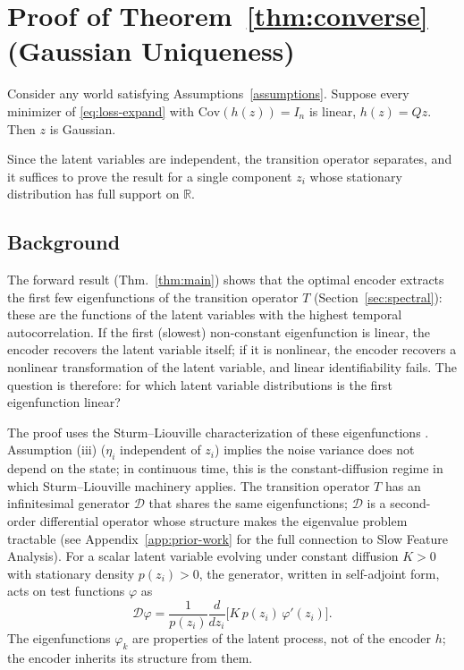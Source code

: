 \newpage
\section{Proof of Theorem~\ref{thm:converse} (Gaussian Uniqueness)}\label{app:converse-proof}

\begin{theoremrestate}
Consider any world satisfying Assumptions~\ref{assumptions}. Suppose every minimizer of \eqref{eq:loss-expand} with $\mathrm{Cov}(h(z)) = I_n$ is linear, $h(z) = Qz$. Then $z$ is Gaussian.
\end{theoremrestate}

Since the latent variables are independent, the transition operator separates, and it suffices to prove the result for a single component $z_i$ whose stationary distribution has full support on $\mathbb{R}$.

\subsection{Background}

The forward result (Thm.~\ref{thm:main}) shows that the optimal encoder extracts the first few eigenfunctions of the transition operator $T$ (Section~\ref{sec:spectral}): these are the functions of the latent variables with the highest temporal autocorrelation.
If the first (slowest) non-constant eigenfunction is linear, the encoder recovers the latent variable itself; if it is nonlinear, the encoder recovers a nonlinear transformation of the latent variable, and linear identifiability fails.
The question is therefore: for which latent variable distributions is the first eigenfunction linear?

The proof uses the Sturm--Liouville characterization of these eigenfunctions \citep{sprekeler2014}. Assumption (iii) ($\eta_i$ independent of $z_i$) implies the noise variance does not depend on the state; in continuous time, this is the constant-diffusion regime in which Sturm--Liouville machinery applies. The transition operator $T$ has an infinitesimal generator $\mathcal{D}$ that shares the same eigenfunctions; $\mathcal{D}$ is a second-order differential operator whose structure makes the eigenvalue problem tractable (see Appendix~\ref{app:prior-work} for the full connection to Slow Feature Analysis).
For a scalar latent variable evolving under constant diffusion $K > 0$ with stationary density $p(z_i) > 0$, the generator, written in self-adjoint form, acts on test functions $\varphi$ as
\begin{equation}\label{eq:sfa-operator}
    \mathcal{D}\varphi = \frac{1}{p(z_i)}\frac{d}{dz_i}
    \Big[K\,p(z_i)\,\varphi'(z_i)\Big].
\end{equation}
The eigenfunctions $\varphi_k$ are properties of the latent process, not of the encoder $h$; the encoder inherits its structure from them.

